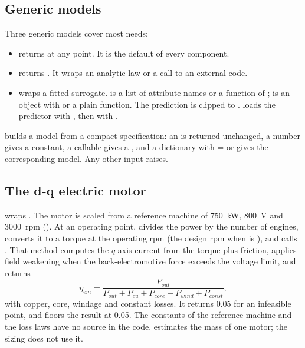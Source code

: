 \documentclass[a4paper,11pt]{article}
\begin{document}
\subsection{Generic models}
Three generic models cover most needs:
\begin{itemize}
\item {} returns  at any point. It is the default
  of every component.
\item {} returns . It wraps an analytic law or
  a call to an external code.
\item {} wraps a fitted
  surrogate.  is a list of  attribute names or a function
  of ;  is an object with  or a plain function. The
  prediction is clipped to .  loads the predictor
  with , then with .
\end{itemize}
 builds a model from a compact specification: an
 is returned unchanged, a number gives a constant, a callable gives a
, and a dictionary with  =  or
 gives the corresponding model. Any other input raises.

\subsection{The d-q electric motor}\label{sec:motor}
 wraps
. The motor is scaled from a reference machine of \SI{750}{kW},
\SI{800}{V} and \SI{3000}{rpm} (). At an operating point,
 divides the power by the number of engines, converts it to a
torque at the operating rpm (the design rpm when  is ), and calls
. That method computes the $q$-axis current from the torque plus
friction, applies field weakening when the back-electromotive force exceeds the voltage
limit, and returns
\begin{equation}
  \eta_{em} = \frac{P_{out}}{P_{out} + P_{cu} + P_{core} + P_{wind} + P_{const}},
\end{equation}
with copper, core, windage and constant losses. It returns 0.05 for an infeasible point, and
 floors the result at 0.05. The constants of the reference machine
and the loss laws have no source in the code.  estimates
the mass of one motor; the sizing does not use it.
\end{document}
